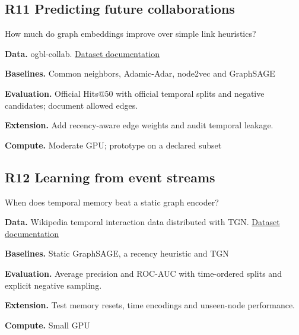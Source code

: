 \documentclass[11pt,letterpaper]{article}
\begin{document}
\begin{minipage}{\linewidth}\subsection*{R11 Predicting future collaborations}
How much do graph embeddings improve over simple link heuristics?\par\textbf{Data.} ogbl-collab. \href{https://ogb.stanford.edu/docs/linkprop/#ogbl-collab}{Dataset documentation}\par
\textbf{Baselines.} Common neighbors, Adamic-Adar, node2vec and GraphSAGE\par
\textbf{Evaluation.} Official Hits@50 with official temporal splits and negative candidates; document allowed edges.\par
\textbf{Extension.} Add recency-aware edge weights and audit temporal leakage.\par
\textbf{Compute.} Moderate GPU; prototype on a declared subset\par
\end{minipage}\par\vspace{8pt}
\begin{minipage}{\linewidth}\subsection*{R12 Learning from event streams}
When does temporal memory beat a static graph encoder?\par\textbf{Data.} Wikipedia temporal interaction data distributed with TGN. \href{https://github.com/twitter-research/tgn}{Dataset documentation}\par
\textbf{Baselines.} Static GraphSAGE, a recency heuristic and TGN\par
\textbf{Evaluation.} Average precision and ROC-AUC with time-ordered splits and explicit negative sampling.\par
\textbf{Extension.} Test memory resets, time encodings and unseen-node performance.\par
\textbf{Compute.} Small GPU\par
\end{minipage}\par\vspace{8pt}
\end{document}

